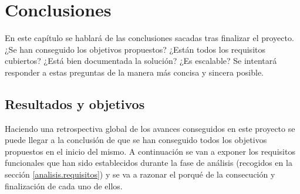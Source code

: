 \chapter{Conclusiones}  \label{conclusiones}

En este capítulo se hablará de las conclusiones sacadas tras finalizar el proyecto. ¿Se han conseguido los objetivos propuestos? ¿Están todos los requisitos cubiertos? ¿Está bien documentada la solución? ¿Es escalable? Se intentará responder a estas preguntas de la manera más concisa y sincera posible. 

\section{Resultados y objetivos} \label{conclusiones.resultados}


 Haciendo una retrospectiva global de los avances conseguidos en este proyecto se puede llegar a la conclusión de que se han conseguido todos los objetivos propuestos en el inicio del mismo. A continuación se van a exponer los requisitos funcionales que han sido establecidos durante la fase de análisis (recogidos en la sección \ref{analisis.requisitos}) y se va a razonar el porqué de la consecución y finalización de cada uno de ellos. 
